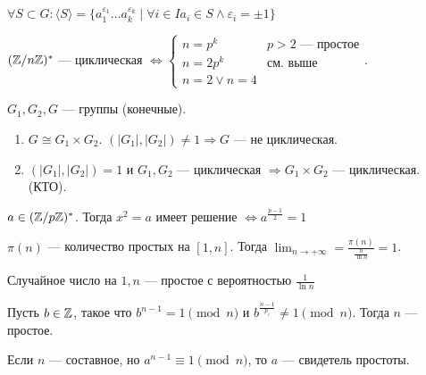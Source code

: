  \begin{theorem}
     $\forall S \subset G\!: \langle S \rangle= \{a_1^{\varepsilon_1} \ldots a_k^{\varepsilon_k} \mid \forall i \in I a_i \in S \land \varepsilon_i = \pm 1\}$
 \end{theorem}
  \begin{theorem}
      $(\mathbb{Z} / n\mathbb{Z})^*$ --- циклическая  $\iff \begin{cases} n=p^k & p>2\text{ --- простое} \\ n = 2 p^k & \text{см. выше} \\ n = 2 \lor n = 4\end{cases}$.
 \end{theorem}
    \begin{statement}
    $G_1, G_2, G$ --- группы (конечные). 
    \begin{enumerate}
        \item $G \cong G_1 \times G_2$. $(|G_1|, |G_2|) \neq 1 \Rightarrow G$ --- не циклическая.
        \item $(|G_1|, |G_2|) = 1$ и $G_1, G_2$ --- циклическая $\Rightarrow G_1 \times G_2$ --- циклическая. (КТО).
    \end{enumerate}
    \end{statement}
\begin{theorem}
    $a \in (\mathbb{Z} / p \mathbb{Z})^*$. Тогда  $x^2 = a$ имеет решение  $\iff a^{\frac{p-1}{2}} = 1$
\end{theorem}
 \begin{theorem}
     $\pi(n)$ --- количество простых на  $[1, n]$. Тогда  $\lim_{n \to +\infty} = \frac{\pi(n)}{\frac{n}{\ln n}} = 1$.
\end{theorem}
\begin{consequence}
   Случайное число на $1, n$ --- простое с вероятностью  $\frac{1}{\ln n}$ 
\end{consequence}
\begin{theorem}
Пусть  $b \in \mathbb{Z}$, такое что  $b^{n-1}= 1 \pmod{n}$ и  $b^{\frac{n-1}{p_i}} \neq 1 \pmod{n}$. Тогда $n$ --- простое.
\end{theorem}
 \begin{definition}
     Если $n$ --- составное, но  $a^{n-1} \equiv 1 \pmod{n}$, то  $a$ --- свидетель простоты.
\end{definition}
